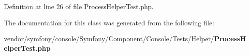 Definition at line 26 of file Process\+Helper\+Test.\+php.



The documentation for this class was generated from the following file\+:\begin{DoxyCompactItemize}
\item 
vendor/symfony/console/\+Symfony/\+Component/\+Console/\+Tests/\+Helper/{\bf Process\+Helper\+Test.\+php}\end{DoxyCompactItemize}
